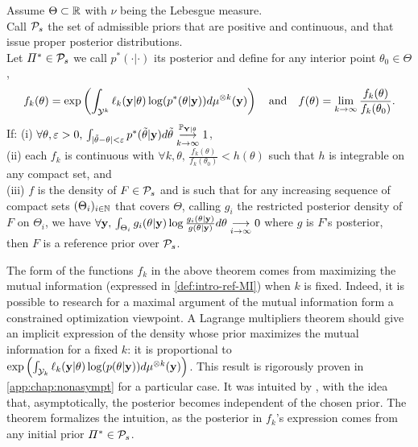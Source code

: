 \begin{thm}\label{thm:intro-ref:explicitRP}
    Assume $\Theta\subset\RR$ with $\nu$ being the Lebesgue measure.\\
    Call $\cP_s$ the set of admissible priors that are positive and continuous, and that issue proper posterior distributions.\\
    Let $\varPi^\ast\in\cP_s$ we call $p^\ast(\cdot|\cdot)$ its posterior and define for any interior point $\theta_0\in\Theta$,
        \begin{equation}
                f_k(\theta) = \exp\left(\int_{\cY^k}\ell_k(\mbf y|\theta)\log(p^\ast(\theta|\mbf y)) d\mu^{\otimes k}(\mbf y) \right) \quad\text{and}\quad  %
                f(\theta) = \lim_{k\rightarrow\infty}\frac{f_k(\theta)}{f_k(\theta_0)}.
        \end{equation}
    If: (i) $ \forall \theta,\eps>0,\,\int_{|\tilde\theta-\theta|<\eps} p^\ast(\tilde\theta|\mbf y)d\tilde\theta \conv[\PP_{\mbf Y|\theta}]{k\rightarrow\infty}1$,\\ (ii) each $f_k$ is continuous with $\forall k,\theta,\, \frac{f_k(\theta)}{f_k(\theta_0)} <h(\theta)$ such that $h$ is integrable on any compact set, and\\
    (iii) $f$ is the density of $F\in\cP_s$  and is such that for any increasing sequence of compact sets $(\Theta_i)_{i\in\NN}$ that covers $\Theta$, calling $g_i$ the restricted posterior density of $F$ on $\Theta_i$, we have $\forall \mbf y,\, \int_{\Theta_i}g_i(\theta|\mbf y)\log\frac{g_i(\theta|\mbf y)}{g(\theta|\mbf y)}d\theta \conv{i\rightarrow\infty}0$ where $g$ is $F$'s posterior,\\
    then $F$ is a reference prior over $\cP_s$.
 \end{thm}

 {
The form of the functions $f_k$ in the above theorem comes from maximizing the mutual information (expressed in \cref{def:intro-ref-MI}) when $k$ is fixed. Indeed, it is possible to research for a maximal argument of the mutual information
form a constrained optimization viewpoint. A Lagrange multipliers theorem should give
an implicit expression of the density whose prior maximizes the mutual information for a fixed $k$: it is
proportional to 
    $\exp\left(\int_{\cY_k}\ell_k(\mbf y|\theta)\log(p(\theta|\mbf y) ) d\mu^{\otimes k}(\mbf y)\right)$. 
This result is rigorously proven in \cref{app:chap:nonasympt} for a particular case. 
It was intuited by \citet{bernardo_bayesian_1994}, with the idea that, asymptotically, the posterior becomes independent of the chosen prior. The theorem formalizes the intuition, as the posterior in $f_k$'s expression comes from any initial prior $\varPi^\ast\in\cP_s$.
}
%

